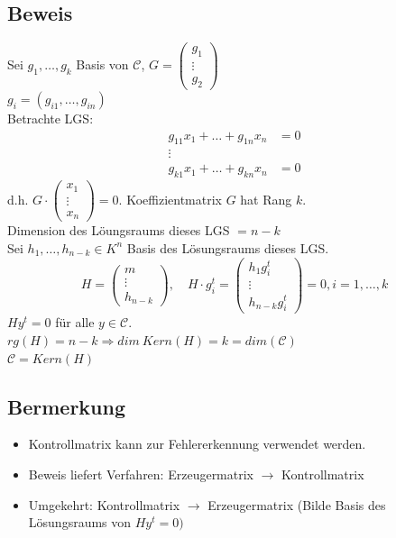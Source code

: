 \subsection{Beweis}
Sei $g_1,\ldots,g_k$ Basis von $\mathcal{C}$, $G=
\begin{pmatrix}
g_1 \\
\vdots \\
g_2
\end{pmatrix} $ \\
$g_i=(g_{i1},\ldots,g_{in})$\\
Betrachte LGS: 
\begin{align*}
	g_{11} x_1 + \ldots + g_{1n} x_n &= 0\\
	\vdots&\\
	g_{k1} x_1 + \ldots + g_{kn} x_n &= 0
\end{align*}
d.h. $G \cdot
\begin{pmatrix}
x_1 \\
\vdots \\
x_n
\end{pmatrix}
= 0$. Koeffizientmatrix $G$ hat Rang $k$.\\
Dimension des L\"oungsraums dieses LGS $= n - k$ \\
Sei $h_1,\ldots,h_{n-k} \in K^n$ Basis des L\"osungsraums dieses LGS. \\
\[
	H=
	\begin{pmatrix}
	m\\
	\vdots \\
	h_{n-k}
	\end{pmatrix}
	, \quad H \cdot g^t_i =
	\begin{pmatrix}
	h_1 g_i^t \\
	\vdots \\
	h_{n-k} g_i^t
	\end{pmatrix}
	 =0,i=1,\ldots,k
\]
$H y^t=0$ f\"ur alle $y \in \mathcal{C}$.\\
$rg(H)=n-k \Rightarrow dim\ Kern(H) = k = dim ( \mathcal{C})$\\
$\mathcal{C}=Kern(H)$

\subsection{Bermerkung}
\begin{itemize}
	\item Kontrollmatrix kann zur Fehlererkennung verwendet werden.	
	\item Beweis liefert Verfahren: Erzeugermatrix $\rightarrow$ Kontrollmatrix
	\item Umgekehrt: Kontrollmatrix $\rightarrow$ Erzeugermatrix (Bilde Basis des L\"osungsraums von $H y^t=0)$
\end{itemize}

